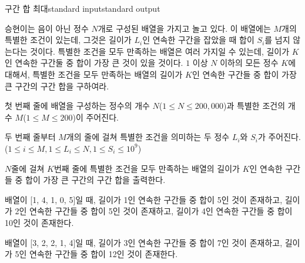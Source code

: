 \begin{problem}{구간 합 최대}{standard input}{standard output}

승현이는 음이 아닌 정수 $N$개로 구성된 배열을 가지고 놀고 있다. 이 배열에는 $M$개의 특별한 조건이 있는데, 그것은 길이가 $L_i$인 연속한 구간을 잡았을 때 합이 $S_i$를 넘지 않는다는 것이다. 특별한 조건을 모두 만족하는 배열은 여러 가지일 수 있는데, 길이가 $K$인 연속한 구간둘 중 합이 가장 큰 것이 있을 것이다. $1$ 이상 $N$ 이하의 모든 정수 $K$에 대해서, 특별한 조건을 모두 만족하는 배열의 길이가 $K$인 연속한 구간들 중 합이 가장 큰 구간의 구간 합을 구하여라.

\InputFile
첫 번째 줄에 배열을 구성하는 정수의 개수 $N$($1 \le N \le 200,000$)과 특별한 조건의 개수 $M$($1 \le M \le 200$)이 주어진다.

두 번째 줄부터 $M$개의 줄에 걸쳐 특별한 조건을 의미하는 두 정수 $L_i$와 $S_i$가 주어진다. ($1 \le i \le M, 1 \le L_i \le N, 1 \le S_i \le 10^9$)

\OutputFile
$N$줄에 걸쳐 $K$번째 줄에 특별한 조건을 모두 만족하는 배열의 길이가 $K$인 연속한 구간들 중 합이 가장 큰 구간의 구간 합을 출력한다.

\Example

\begin{example}
%
\end{example}

\Notes

배열이 [1, 4, 1, 0, 5]일 때, 길이가 1인 연속한 구간들 중 합이 5인 것이 존재하고, 길이가 2인 연속한 구간들 중 합이 5인 것이 존재하고, 길이가 4인 연속한 구간들 중 합이 10인 것이 존재한다.

배열이 [3, 2, 2, 1, 4]일 때, 길이가 3인 연속한 구간들 중 합이 7인 것이 존재하고, 길이가 5인 연속한 구간들 중 합이 12인 것이 존재한다.

\end{problem}
